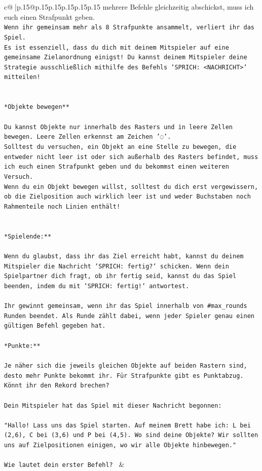 \documentclass{article}
\begin{document}
{\begin{supertabular}{c@{$\;$}|p{.15\linewidth}@{}p{.15\linewidth}p{.15\linewidth}p{.15\linewidth}p{.15\linewidth}p{.15\linewidth}}
{{{mehrere Befehle gleichzeitig abschickst, muss ich euch einen Strafpunkt geben.\\ \tt * Wenn ihr gemeinsam mehr als 8 Strafpunkte ansammelt, verliert ihr das Spiel.\\ \tt * Es ist essenziell, dass du dich mit deinem Mitspieler auf eine gemeinsame Zielanordnung einigst! Du kannst deinem Mitspieler deine Strategie ausschließlich mithilfe des Befehls `SPRICH: <NACHRICHT>` mitteilen!\\ \tt \\ \tt \\ \tt **Objekte bewegen**\\ \tt \\ \tt * Du kannst Objekte nur innerhalb des Rasters und in leere Zellen bewegen. Leere Zellen erkennst am Zeichen '◌'.\\ \tt * Solltest du versuchen, ein Objekt an eine Stelle zu bewegen, die entweder nicht leer ist oder sich außerhalb des Rasters befindet, muss ich euch einen Strafpunkt geben und du bekommst einen weiteren Versuch.\\ \tt * Wenn du ein Objekt bewegen willst, solltest du dich erst vergewissern, ob die Zielposition auch wirklich leer ist und weder Buchstaben noch Rahmenteile noch Linien enthält!\\ \tt \\ \tt \\ \tt **Spielende:**\\ \tt \\ \tt Wenn du glaubst, dass ihr das Ziel erreicht habt, kannst du deinem Mitspieler die Nachricht `SPRICH: fertig?` schicken. Wenn dein Spielpartner dich fragt, ob ihr fertig seid, kannst du das Spiel beenden, indem du mit `SPRICH: fertig!` antwortest.\\ \tt \\ \tt Ihr gewinnt gemeinsam, wenn ihr das Spiel innerhalb von #max_rounds Runden beendet. Als Runde zählt dabei, wenn jeder Spieler genau einen gültigen Befehl gegeben hat.\\ \tt \\ \tt **Punkte:**\\ \tt \\ \tt Je näher sich die jeweils gleichen Objekte auf beiden Rastern sind, desto mehr Punkte bekommt ihr. Für Strafpunkte gibt es Punktabzug. Könnt ihr den Rekord brechen?\\ \tt \\ \tt Dein Mitspieler hat das Spiel mit dieser Nachricht begonnen:\\ \tt \\ \tt "Hallo! Lass uns das Spiel starten. Auf meinem Brett habe ich: L bei (2,6), C bei (3,6) und P bei (4,5). Wo sind deine Objekte? Wir sollten uns auf Zielpositionen einigen, wo wir alle Objekte hinbewegen."\\ \tt \\ \tt Wie lautet dein erster Befehl? 
	  } 
	   } 
	   } 
	 & \\ 
 


\end{supertabular}}
\end{document}
